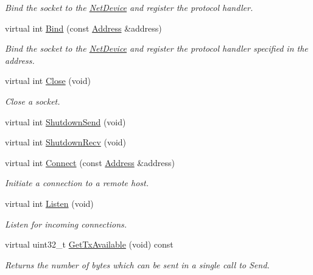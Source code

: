 \begin{DoxyCompactItemize}
\begin{DoxyCompactList}\small\item\em Bind the socket to the \hyperlink{classns3_1_1NetDevice}{Net\+Device} and register the protocol handler. \end{DoxyCompactList}\item 
virtual int \hyperlink{classns3_1_1PacketSocket_a1c50ba1bd9d23186d1c09f60d298095f}{Bind} (const \hyperlink{classns3_1_1Address}{Address} \&address)
\begin{DoxyCompactList}\small\item\em Bind the socket to the \hyperlink{classns3_1_1NetDevice}{Net\+Device} and register the protocol handler specified in the address. \end{DoxyCompactList}\item 
virtual int \hyperlink{classns3_1_1PacketSocket_acd416d93105815a2d2d2089d342efdd7}{Close} (void)
\begin{DoxyCompactList}\small\item\em Close a socket. \end{DoxyCompactList}\item 
virtual int \hyperlink{classns3_1_1PacketSocket_a4eb90477fd557de26e6da3ae5e47ccc7}{Shutdown\+Send} (void)
\item 
virtual int \hyperlink{classns3_1_1PacketSocket_a62cc0eda133c88406a3d5f0296d4436c}{Shutdown\+Recv} (void)
\item 
virtual int \hyperlink{classns3_1_1PacketSocket_a31cb58ed8f925fcc962e0ae78b31fe91}{Connect} (const \hyperlink{classns3_1_1Address}{Address} \&address)
\begin{DoxyCompactList}\small\item\em Initiate a connection to a remote host. \end{DoxyCompactList}\item 
virtual int \hyperlink{classns3_1_1PacketSocket_a263c5cd1fee6744bd79d997cdcbc7ef4}{Listen} (void)
\begin{DoxyCompactList}\small\item\em Listen for incoming connections. \end{DoxyCompactList}\item 
virtual uint32\+\_\+t \hyperlink{classns3_1_1PacketSocket_a11bf40b37d8cecd2067c880244be5de4}{Get\+Tx\+Available} (void) const 
\begin{DoxyCompactList}\small\item\em Returns the number of bytes which can be sent in a single call to Send. \end{DoxyCompactList}\item 

\end{DoxyCompactItemize}
